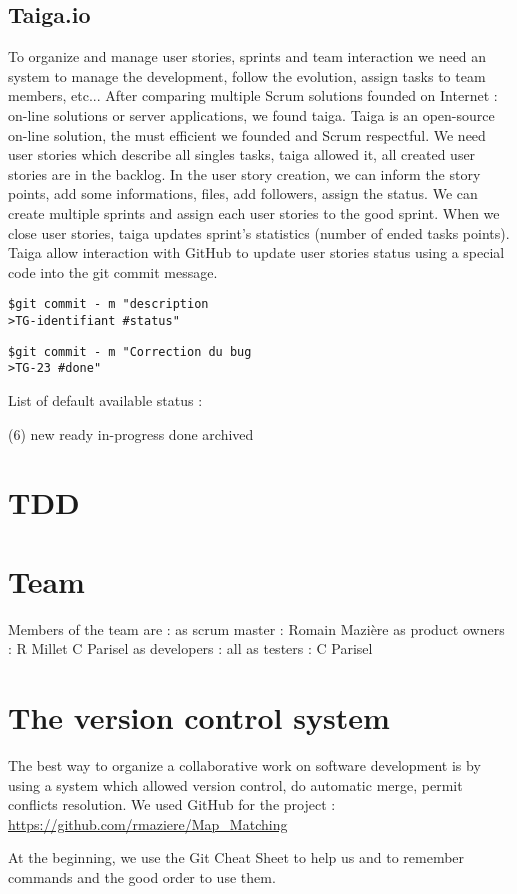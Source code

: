 \subsection{Taiga.io}
To organize and manage user stories, sprints and team interaction we need an system to manage the development, follow the evolution, assign tasks to team members, etc...
After comparing multiple Scrum solutions founded on Internet : on-line solutions or server applications, we found taiga.
Taiga is an open-source on-line solution, the must efficient we founded and Scrum respectful.
We need user stories which describe all singles tasks, taiga allowed it, all created user stories are in the backlog.
In the user story creation, we can inform the story points, add some informations, files, add followers, assign the status.
We can create multiple sprints and assign each user stories to the good sprint.
When we close user stories, taiga updates sprint's statistics (number of ended tasks points).
Taiga allow interaction with GitHub to update user stories status using a special code into the git commit message.
\begin{lstlisting}[frame=single, caption="The default syntax"]
$git commit - m "description
>TG-identifiant #status"
\end{lstlisting}

\begin{lstlisting}[frame=single, caption="For example mark the user story 23 to 'Done'"]
$git commit - m "Correction du bug
>TG-23 #done"
\end{lstlisting}

List of default available status : 
\begin{tasks}(6)
	\task new
	\task ready
	\task in-progress
	\task done
	\task archived
\end{tasks}

\section{TDD}

\section{Team}
Members of the team are :
as scrum master : Romain Mazière
as product owners :
R Millet
C Parisel
as developers :
all
as testers :
C Parisel
\section{The version control system}
The best way to organize a collaborative work on software development is by using a system which allowed version control, do automatic merge, permit conflicts resolution.
We used GitHub for the project : \url{https://github.com/rmaziere/Map_Matching}

At the beginning, we use the Git Cheat Sheet to help us and to remember commands and the good order to use them.
